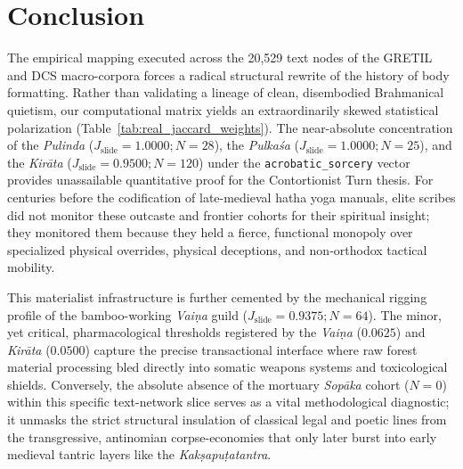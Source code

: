 \documentclass[11pt,twoside,letterpaper]{article}
\begin{document}

\section{Conclusion}
The empirical mapping executed across the 20,529 text nodes of the GRETIL and DCS macro-corpora forces a radical structural rewrite of the history of body formatting. Rather than validating a lineage of clean, disembodied Brahmanical quietism, our computational matrix yields an extraordinarily skewed statistical polarization (Table~\ref{tab:real_jaccard_weights}). The near-absolute concentration of the \textit{Pulinda} ($J_{\text{slide}} = 1.0000; N = 28$), the \textit{Pulkaśa} ($J_{\text{slide}} = 1.0000; N = 25$), and the \textit{Kirāta} ($J_{\text{slide}} = 0.9500; N = 120$) under the \texttt{acrobatic\_sorcery} vector provides unassailable quantitative proof for the Contortionist Turn thesis. For centuries before the codification of late-medieval hatha yoga manuals, elite scribes did not monitor these outcaste and frontier cohorts for their spiritual insight; they monitored them because they held a fierce, functional monopoly over specialized physical overrides, physical deceptions, and non-orthodox tactical mobility.

\begin{table}[ht]

\caption{Empirical Localized Jaccard Coefficients ($J_{\text{slide}}$) Across Subaltern Technical Cohorts}
\label{tab:real_jaccard_weights}
\end{table}

This materialist infrastructure is further cemented by the mechanical rigging profile of the bamboo-working \textit{Vaiṇa} guild ($J_{\text{slide}} = 0.9375; N = 64$). The minor, yet critical, pharmacological thresholds registered by the \textit{Vaiṇa} ($0.0625$) and \textit{Kirāta} ($0.0500$) capture the precise transactional interface where raw forest material processing bled directly into somatic weapons systems and toxicological shields. Conversely, the absolute absence of the mortuary \textit{Sopāka} cohort ($N = 0$) within this specific text-network slice serves as a vital methodological diagnostic; it unmasks the strict structural insulation of classical legal and poetic lines from the transgressive, antinomian corpse-economies that only later burst into early medieval tantric layers like the \textit{Kakṣapuṭatantra}.
\end{document}
